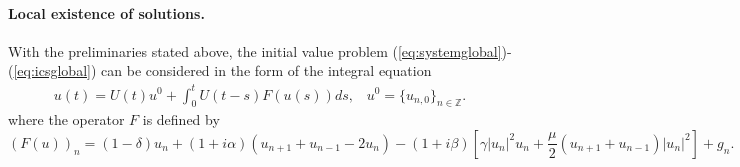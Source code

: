 \documentclass[preprintnumbers,amsmath,amssymb]{revtex4}
\begin{document}
\paragraph{Local existence of solutions.}
With the preliminaries stated above, the initial value problem 
(\ref{eq:systemglobal})-(\ref{eq:icsglobal}) can be considered in the form of the integral equation
\begin{eqnarray}
\label{integ1}
u(t)=U(t)u^0+\int_{0}^{t}U(t-s)F(u(s))ds,\;\;\;u^0=\{u_{n,0}\}_{n\in\mathbb{Z}}.
\end{eqnarray}
%
%
where the operator $F$ is defined by
\begin{equation}
\label{nop}
\left(F(u)\right)_n=
(1-\delta)u_n+(1+i\alpha)(u_{n+1}+u_{n-1}-2u_n)-
(1+i\beta)\left[\gamma|u_n|^2u_n+\frac{\mu}{2}(u_{n+1}+u_{n-1})|u_n|^2\right]+g_n.
\end{equation}
\end{document}
